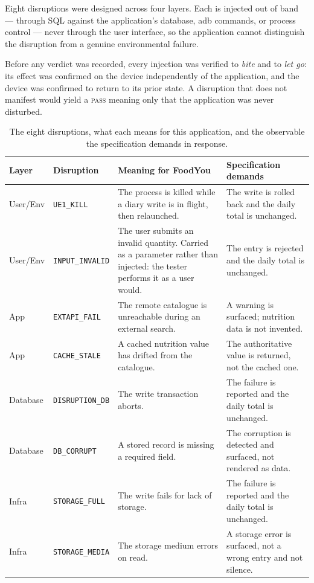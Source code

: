 \documentclass[11pt,a4paper]{article}
\newcommand{\gate}[1]{\texttt{\small #1}}
\begin{document}
Eight disruptions were designed across four layers. Each is injected out of band
--- through SQL against the application's database, adb commands, or process
control --- never through the user interface, so the application cannot
distinguish the disruption from a genuine environmental failure.

Before any verdict was recorded, every injection was verified to \emph{bite} and
to \emph{let go}: its effect was confirmed on the device independently of the
application, and the device was confirmed to return to its prior state. A
disruption that does not manifest would yield a \textsc{pass} meaning only that
the application was never disturbed.

\begin{table}[h]
\centering\footnotesize
\caption{The eight disruptions, what each means for this application, and the
observable the specification demands in response.}
\label{tab:disruptions}
\begin{tabular}{@{}llp{4.6cm}p{4.4cm}@{}}
\toprule
Layer & Disruption & Meaning for FoodYou & Specification demands \\
\midrule
User/Env & \gate{UE1\_KILL} & The process is killed while a diary write is in
flight, then relaunched. & The write is rolled back and the daily total is
unchanged. \\
\addlinespace
User/Env & \gate{INPUT\_INVALID} & The user submits an invalid quantity. Carried
as a parameter rather than injected: the tester performs it as a user would. &
The entry is rejected and the daily total is unchanged. \\
\addlinespace
App & \gate{EXTAPI\_FAIL} & The remote catalogue is unreachable during an
external search. & A warning is surfaced; nutrition data is not invented. \\
\addlinespace
App & \gate{CACHE\_STALE} & A cached nutrition value has drifted from the
catalogue. & The authoritative value is returned, not the cached one. \\
\addlinespace
Database & \gate{DISRUPTION\_DB} & The write transaction aborts. & The failure is
reported and the daily total is unchanged. \\
\addlinespace
Database & \gate{DB\_CORRUPT} & A stored record is missing a required field. &
The corruption is detected and surfaced, not rendered as data. \\
\addlinespace
Infra & \gate{STORAGE\_FULL} & The write fails for lack of storage. & The failure
is reported and the daily total is unchanged. \\
\addlinespace
Infra & \gate{STORAGE\_MEDIA} & The storage medium errors on read. & A storage
error is surfaced, not a wrong entry and not silence. \\
\bottomrule
\end{tabular}
\end{table}
\end{document}
